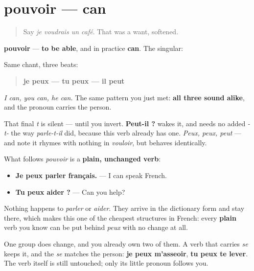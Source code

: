 \section[pouvoir]{pouvoir — can}

\label{lesson:FR-C33-pouvoir}



\begin{quote}
Say \emph{je voudrais un café}. That was a want, softened.
\end{quote}

\begin{cousinweb}
\textbf{pouvoir} — \textbf{to be able}, and in practice \textbf{can}. The singular:

Same chant, three beats:

\begin{quote}
\textbf{je peux — tu peux — il peut}
\end{quote}

\emph{I can, you can, he can.} The same pattern you just met: \textbf{all three sound alike}, and the pronoun carries the person.

That final \emph{t} is silent — until you invert. \textbf{Peut-il ?} wakes it, and needs no added \emph{-t-} the way \emph{parle-t-il} did, because this verb already has one. \emph{Peux, peux, peut} — and note it rhymes with nothing in \emph{vouloir}, but behaves identically.

What follows \emph{pouvoir} is a \textbf{plain, unchanged verb}:

\begin{itemize}
\raggedright
  \item \textbf{Je peux parler français.} — I can speak French.
  \item \textbf{Tu peux aider ?} — Can you help?
\end{itemize}

Nothing happens to \emph{parler} or \emph{aider}. They arrive in the dictionary form and stay there, which makes this one of the cheapest structures in French: every \textbf{plain} verb you know can be put behind \emph{peux} with no change at all.

One group does change, and you already own two of them. A verb that carries \emph{se} keeps it, and the \emph{se} matches the person: \textbf{je peux m'asseoir}, \textbf{tu peux te lever}. The verb itself is still untouched; only its little pronoun follows you.
\end{cousinweb}

